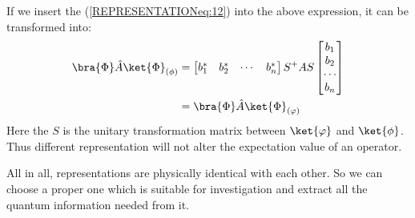 If we insert the (\ref{REPRESENTATIONeq:12}) into the above
expression, it can be transformed into:
\begin{align}\label{REPRESENTATIONeq:17}
\bra{\Phi}\hat{A}\ket{\Phi}_{(\phi)} &=
\begin{bmatrix}
  b_{1}^{*} & b_{2}^{*} & \cdots & b_{n}^{*} \\
\end{bmatrix}
S^{+}AS
   \begin{bmatrix}
     b_{1} \\
     b_{2} \\
     \cdots \\
     b_{n} \\
   \end{bmatrix} \nonumber \\
   &=\bra{\Phi}\hat{A}\ket{\Phi}_{(\varphi)}
\end{align}
Here the $S$ is the unitary transformation matrix between
$\ket{\varphi}$ and $\ket{\phi}$. Thus different representation will
not alter the expectation value of an operator.

All in all, representations are physically identical with each
other. So we can choose a proper one which is suitable for
investigation and extract all the quantum information needed from
it.



